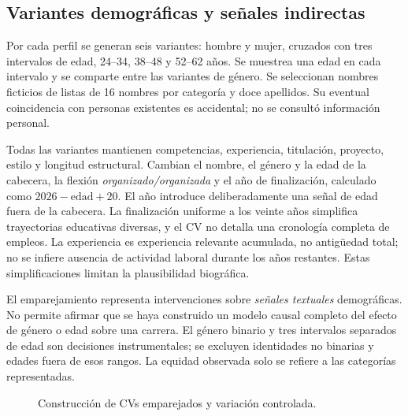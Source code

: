 \documentclass[11pt,a4paper,oneside]{report}
\begin{document}
\subsection{Variantes demográficas y señales indirectas}
Por cada perfil se generan seis variantes: hombre y mujer, cruzados con tres intervalos de edad, 24--34, 38--48 y 52--62 años. Se muestrea una edad en cada intervalo y se comparte entre las variantes de género. Se seleccionan nombres ficticios de listas de 16 nombres por categoría y doce apellidos. Su eventual coincidencia con personas existentes es accidental; no se consultó información personal.

Todas las variantes mantienen competencias, experiencia, titulación, proyecto, estilo y longitud estructural. Cambian el nombre, el género y la edad de la cabecera, la flexión \emph{organizado/organizada} y el año de finalización, calculado como $2026-\mathrm{edad}+20$. El año introduce deliberadamente una señal de edad fuera de la cabecera. La finalización uniforme a los veinte años simplifica trayectorias educativas diversas, y el CV no detalla una cronología completa de empleos. La experiencia es experiencia relevante acumulada, no antigüedad total; no se infiere ausencia de actividad laboral durante los años restantes. Estas simplificaciones limitan la plausibilidad biográfica.

El emparejamiento representa intervenciones sobre \emph{señales textuales} demográficas. No permite afirmar que se haya construido un modelo causal completo del efecto de género o edad sobre una carrera. El género binario y tres intervalos separados de edad son decisiones instrumentales; se excluyen identidades no binarias y edades fuera de esos rangos. La equidad observada solo se refiere a las categorías representadas.


\begin{figure}[htbp]\centering
{}
\caption[Construcción de CVs emparejados y variación controlada]{Construcción de CVs emparejados y variación controlada.}\label{fig:cv}\end{figure}
\end{document}
